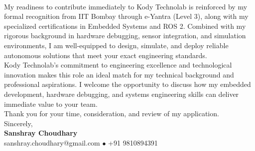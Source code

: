 \documentclass[10pt,a4paper]{article}%
\begin{document}
\noindent \vspace{8pt}\\

\noindent My readiness to contribute immediately to Kody Technolab is reinforced by my formal recognition from IIT Bombay through e-Yantra (Level 3), along with my specialized certifications in Embedded Systems and ROS 2. Combined with my rigorous background in hardware debugging, sensor integration, and simulation environments, I am well-equipped to design, simulate, and deploy reliable autonomous solutions that meet your exact engineering standards. \vspace{8pt}\\

\noindent Kody Technolab's commitment to engineering excellence and technological innovation makes this role an ideal match for my technical background and professional aspirations. I welcome the opportunity to discuss how my embedded development, hardware debugging, and systems engineering skills can deliver immediate value to your team. \vspace{8pt}\\%

\noindent Thank you for your time, consideration, and review of my application. \vspace{18pt}\\%

\noindent Sincerely, \vspace{8pt}\\%
\textbf{Sanshray Choudhary} \\%
sanshray.choudhary@gmail.com $\bullet$ +91 9810894391 \\%
\end{document}

